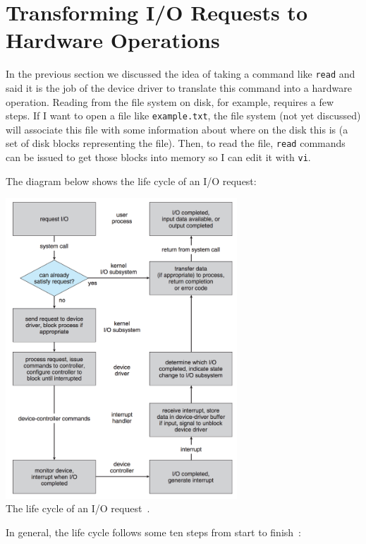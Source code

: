 \section*{Transforming I/O Requests to Hardware Operations}

In the previous section we discussed the idea of taking a command like \texttt{read} and said it is the job of the device driver to translate this command into a hardware operation. Reading from the file system on disk, for example, requires a few steps. If I want to open a file like \texttt{example.txt}, the file system (not yet discussed) will associate this file with some information about where on the disk this is (a set of disk blocks representing the file). Then, to read the file, \texttt{read} commands can be issued to get those blocks into memory so I can edit it with \texttt{vi}.

The diagram below shows the life cycle of an I/O request:

\begin{center}
	\includegraphics[width=0.65\textwidth]{images/io-lifecycle.png}\\
	The life cycle of an I/O request~\cite{osc}.
\end{center}

In general, the life cycle follows some ten steps from start to finish~\cite{osc}:

